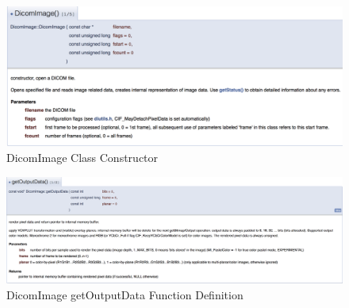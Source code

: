 \begin{figure}[ht]
\centering
\includegraphics[width = 0.95\hsize]{./figures/DicomImageConstructor}
\caption{DicomImage Class Constructor}
\end{figure}


\begin{figure}[ht]
\centering
\includegraphics[width = 0.95\hsize]{./figures/getOutputData}
\caption{DicomImage getOutputData Function Definition}
\end{figure}
